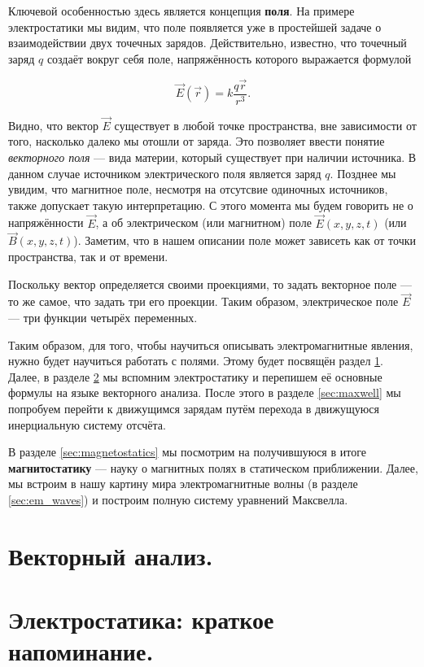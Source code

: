 \documentclass[a4paper,12pt]{article}
\begin{document}
Ключевой особенностью здесь является концепция \textbf{поля}. На
примере электростатики мы видим, что поле появляется уже в простейшей
задаче о взаимодействии двух точечных зарядов. Действительно,
известно, что точечный заряд $q$ создаёт вокруг себя поле,
напряжённость которого выражается формулой 

\begin{equation}
  \label{eq:q_E}
  \vec{E} (\vec{r}) = k \frac{q \vec{r}}{r^3}.
\end{equation}

Видно, что вектор $\vec{E}$ существует в любой точке пространства, вне
зависимости от того, насколько далеко мы отошли от заряда. Это
позволяет ввести понятие \textit{векторного поля} --- вида материи,
который существует при наличии источника. В данном случае источником
электрического поля является заряд $q$. Позднее мы увидим, что
магнитное поле, несмотря на отсутсвие одиночных источников, также
допускает такую интерпретацию. С этого момента мы будем говорить не о
напряжённости $\vec{E}$, а об электрическом (или магнитном) поле
$\vec{E}(x,y,z,t)$ (или $\vec{B}(x,y,z,t)$). Заметим, что в нашем
описании поле может зависеть как от точки пространства, так и от
времени.

Поскольку вектор определяется своими проекциями, то задать векторное
поле --- то же самое, что задать три его проекции. Таким образом,
электрическое поле $\vec{E}$ --- три функции четырёх переменных. 

Таким образом, для того, чтобы научиться описывать электромагнитные
явления, нужно будет научиться работать с полями. Этому будет посвящён
раздел \ref{sec:vector_analysis}. Далее, в разделе
\ref{sec:electrostatics} мы вспомним электростатику и перепишем её
основные формулы на языке векторного анализа. После этого в разделе
\ref{sec:maxwell} мы попробуем перейти к движущимся зарядам путём
перехода в движущуюся инерциальную систему отсчёта.

В разделе \ref{sec:magnetostatics} мы посмотрим на получившуюся в
итоге \textbf{магнитостатику} --- науку о магнитных полях в
статическом приближении. Далее, мы встроим в нашу картину мира
электромагнитные волны (в разделе \ref{sec:em_waves}) и построим
полную систему уравнений Максвелла. 

\section{Векторный анализ.}
\label{sec:vector_analysis}

\section{Электростатика: краткое напоминание.}
\label{sec:electrostatics}
\end{document}
